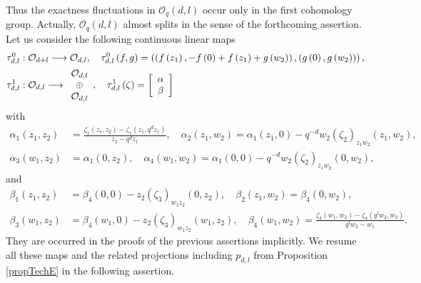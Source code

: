 \documentclass[12pt,reqno]{amsart}%
\theoremstyle{plain}
\numberwithin{theorem}{section} \numberwithin{equation}{section}
\numberwithin{lemma}{section}
\numberwithin{remark}{section}
\numberwithin{example}{section}
\numberwithin{proposition}{section}
\numberwithin{definition}{section}
\numberwithin{corollary}{section}
\begin{document}
Thus the exactness fluctuations in $\mathcal{O}_{q}\left(  d,l\right)  $ occur
only in the first cohomology group. Actually, $\mathcal{O}_{q}\left(
d,l\right)  $ almost splits in the sense of the forthcoming assertion. Let us
consider the following continuous linear maps%
\begin{align*}
\tau_{d,l}^{0}  &  :\mathcal{O}_{d+l}\longrightarrow\mathcal{O}_{d,l}%
,\quad\tau_{d,l}^{0}\left(  f,g\right)  =\left(  \left(  f\left(
z_{1}\right)  ,-f\left(  0\right)  +f\left(  z_{1}\right)  +g\left(
w_{2}\right)  \right)  ,\left(  g\left(  0\right)  ,g\left(  w_{2}\right)
\right)  \right)  ,\\
\tau_{d,l}^{1}  &  :\mathcal{O}_{d,l}\longrightarrow%
\begin{array}
[c]{c}%
\mathcal{O}_{d,l}\\
\oplus\\
\mathcal{O}_{d,l}%
\end{array}
,\quad\tau_{d,l}^{1}\left(  \zeta\right)  =\left[
\begin{array}
[c]{c}%
\alpha\\
\beta
\end{array}
\right]
\end{align*}
with
\begin{align*}
\alpha_{1}\left(  z_{1},z_{2}\right)   &  =\frac{\zeta_{1}\left(  z_{1}%
,z_{2}\right)  -\zeta_{1}\left(  z_{1},q^{d}z_{1}\right)  }{z_{2}-q^{d}z_{1}%
},\quad\alpha_{2}\left(  z_{1},w_{2}\right)  =\alpha_{1}\left(  z_{1}%
,0\right)  -q^{-d}w_{2}\left(  \zeta_{2}\right)  _{z_{1}w_{2}}\left(
z_{1},w_{2}\right)  ,\\
\alpha_{3}\left(  w_{1},z_{2}\right)   &  =\alpha_{1}\left(  0,z_{2}\right)
,\quad\alpha_{4}\left(  w_{1},w_{2}\right)  =\alpha_{1}\left(  0,0\right)
-q^{-d}w_{2}\left(  \zeta_{2}\right)  _{z_{1}w_{2}}\left(  0,w_{2}\right)  ,
\end{align*}
and%
\begin{align*}
\beta_{1}\left(  z_{1},z_{2}\right)   &  =\beta_{4}\left(  0,0\right)
-z_{2}\left(  \zeta_{3}\right)  _{w_{1}z_{2}}\left(  0,z_{2}\right)
,\quad\beta_{2}\left(  z_{1},w_{2}\right)  =\beta_{4}\left(  0,w_{2}\right)
,\\
\beta_{3}\left(  w_{1},z_{2}\right)   &  =\beta_{4}\left(  w_{1},0\right)
-z_{2}\left(  \zeta_{3}\right)  _{w_{1}z_{2}}\left(  w_{1},z_{2}\right)
,\quad\beta_{4}\left(  w_{1},w_{2}\right)  =\frac{\zeta_{4}\left(  w_{1}%
,w_{2}\right)  -\zeta_{4}\left(  q^{l}w_{2},w_{2}\right)  }{q^{l}w_{2}-w_{1}}.
\end{align*}
They are occurred in the proofs of the previous assertions implicitly. We
resume all these maps and the related projections including $p_{d,l}$ from
Proposition \ref{propTechE} in the following assertion.
\end{document}
